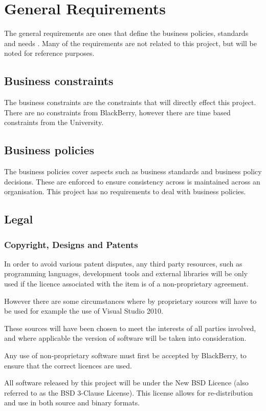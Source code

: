 \section{General Requirements}
The general requirements are ones that define the business policies, standards 
and needs \citep{cadle10}. Many of the requirements are not related to this 
project, but will be noted for reference purposes.

\subsection{Business constraints}
The business constraints are the constraints that will directly effect this 
project. There are no constraints from BlackBerry, however there are time based 
constraints from the University.

\subsection{Business policies}
The business policies cover aspects such as business standards and business 
policy decisions. These are enforced to ensure consistency across is maintained 
across an organisation. This project has no requirements to deal with business 
policies.

\subsection{Legal}
\subsubsection*{Copyright, Designs and Patents}

In order to avoid various patent disputes, any third party resources, such as 
programming languages, development tools and external libraries will be only 
used if the licence associated with the item is of a non-proprietary agreement.

However there are some circumstances where by proprietary sources will have to 
be used for example the use of Visual Studio 2010. 

These sources will have been chosen to meet the interests of all parties 
involved, and where applicable the version of software will be taken into 
consideration. 

Any use of non-proprietary software must first be accepted by BlackBerry, to 
ensure that the correct licences are used.

All software released by this project will be under the New BSD Licence (also 
referred to as the BSD 3-Clause License). This license allows for 
re-distribution and use in both source and binary formats. 

